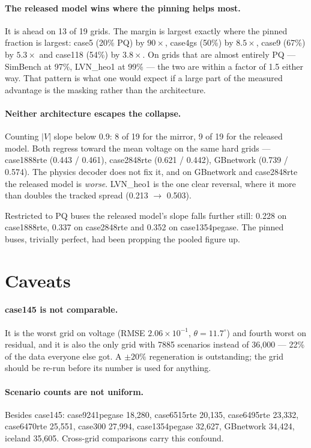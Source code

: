 \documentclass[10pt]{article}
\begin{document}
\paragraph{The released model wins where the pinning helps most.} It is ahead on
13 of 19 grids. The margin is largest exactly where the pinned fraction is
largest: case5 (20\% PQ) by $90\times$, case4gs (50\%) by $8.5\times$,
case9 (67\%) by $5.3\times$ and case118 (54\%) by $3.8\times$. On grids that are almost
entirely PQ --- SimBench at 97\%, LVN\_heo1 at 99\% --- the two are within a
factor of 1.5 either way. That pattern is what one would expect if a large part
of the measured advantage is the masking rather than the architecture.

\paragraph{Neither architecture escapes the collapse.} Counting $|V|$ slope
below 0.9: 8 of 19 for the mirror, 9 of 19 for the released model. Both
regress toward the mean voltage on the same hard grids --- case1888rte
(0.443 / 0.461), case2848rte (0.621 / 0.442), GBnetwork (0.739 / 0.574). The
physics decoder does not fix it, and on GBnetwork and case2848rte the released
model is \emph{worse}. LVN\_heo1 is the one clear reversal, where it more than
doubles the tracked spread (0.213 $\rightarrow$ 0.503).

Restricted to PQ buses the released model's slope falls further still: 0.228 on
case1888rte, 0.337 on case2848rte and 0.352 on case1354pegase. The pinned
buses, trivially perfect, had been propping the pooled figure up.

\section{Caveats}

\paragraph{case145 is not comparable.} It is the worst grid on voltage
(RMSE $2.06\times10^{-1}$, $\theta = 11.7^\circ$) and fourth worst on residual,
and it is also the only grid with 7885 scenarios instead of 36{,}000 --- 22\% of
the data everyone else got. A $\pm20\%$ regeneration is outstanding; the grid
should be re-run before its number is used for anything.

\paragraph{Scenario counts are not uniform.} Besides case145: case9241pegase
18{,}280, case6515rte 20{,}135, case6495rte 23{,}332, case6470rte 25{,}551,
case300 27{,}994, case1354pegase 32{,}627, GBnetwork 34{,}424, iceland 35{,}605.
Cross-grid comparisons carry this confound.
\end{document}
